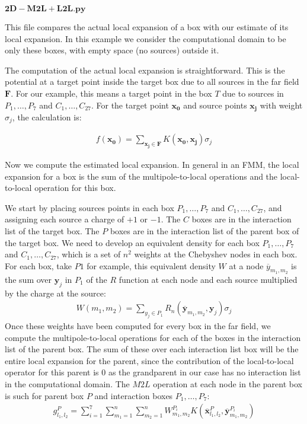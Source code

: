 
$\mathbf{2D-M2L+L2L.py}$

This file compares the actual local expansion of a box with our estimate of its local expansion. In this example we consider the computational domain to be only these boxes, with empty space (no sources) outside it.

The computation of the actual local expansion is straightforward. This is the potential at a target point inside the target box due to all sources in the far field $\mathbf{F}$. For our example, this means a target point in the box $T$ due to sources in $P_1,\dots,P_7$ and $C_1,\dots,C_{27}$. For the target point $\mathbf{x_0}$ and source points $\mathbf{x_j}$ with weight $\sigma_j$, the calculation is:

\begin{align}
f(\mathbf{x_0}) = \sum_{\mathbf{x_j}\in \mathbf{F}} K(\mathbf{x_0},\mathbf{x_j})\sigma_j
\end{align}

Now we compute the estimated local expansion. In general in an FMM, the local expansion for a box is the sum of the multipole-to-local operations and the local-to-local operation for this box.

We start by placing sources points in each box $P_1,\dots,P_7$ and $C_1,\dots,C_{27}$, and assigning each source a charge of $+1$ or $-1$. The $C$ boxes are in the interaction list of the target box. The $P$ boxes are in the interaction list of the parent box of the target box. We need to develop an equivalent density for each box $P_1,\dots,P_7$ and $C_1,\dots,C_{27}$, which is a set of $n^2$ weights at the Chebyshev nodes in each box. For each box, take $P1$ for example, this equivalent density $W$ at a node $\overline{y}_{m_1,m_2}$ is the sum over $\mathbf{y}_j$ in $P_1$ of the $R$ function at each node and each source multiplied by the charge at the source:
\begin{align}
W(m_1,m_2) = \sum_{y_j\in P_1} R_n(\mathbf{\overline{y}}_{m_1,m_2},\mathbf{y}_j)\sigma_j
\end{align}
Once these weights have been computed for every box in the far field, we compute the multipole-to-local operations for each of the boxes in the interaction list of the parent box. The sum of these over each interaction list box will be the entire local expansion for the parent, since the contribution of the local-to-local operator for this parent is $0$ as the grandparent in our case has no interaction list in the computational domain. The $M2L$ operation at each node in the parent box is such for parent box $P$ and interaction boxes $P_1,\dots,P_7$:
\begin{align}
g^P_{l_1,l_2} = \sum_{i=1}^7\sum_{m_1=1}^n\sum_{m_2=1}^n W_{m_1,m_2}^{P_i}K(\mathbf{\overline{x}}^P_{l_1,l_2},\mathbf{\overline{y}}^{P_i}_{m_1,m_2})
\end{align}

